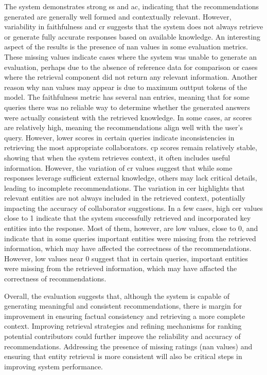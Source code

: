 The system demonstrates strong \gls{ss} and \gls{ac}, indicating that the recommendations generated are generally well formed and contextually relevant.
However, variability in faithfulness and \gls{cr} suggests that the system does not always retrieve or generate fully accurate responses based on available knowledge.
An interesting aspect of the results is the presence of \gls{nan} values in some evaluation metrics.
These missing values indicate cases where the system was unable to generate an evaluation, perhaps due to the absence of reference data for comparison or cases where the retrieval component did not return any relevant information.
Another reason why \gls{nan} values may appear is due to maximum outtput tokens of the model.
The faithfulness metric has several \gls{nan} entries, meaning that for some queries there was no reliable way to determine whether the generated answers were actually consistent with the retrieved knowledge.
In some cases, \gls{ar} scores are relatively high, meaning the recommendations align well with the user's query.
However, lower scores in certain queries indicate inconsistencies in retrieving the most appropriate collaborators.
\gls{cp} scores remain relatively stable, showing that when the system retrieves context, it often includes useful information.
However, the variation of \gls{cr} values suggest that while some responses leverage sufficient external knowledge, others may lack critical details, leading to incomplete recommendations.
The variation in \gls{cer} highlights that relevant entities are not always included in the retrieved context, potentially impacting the accuracy of collaborator suggestions.
In a few cases, high \gls{cer} values close to 1 indicate that the system successfully retrieved and incorporated key entities into the response.
Most of them, however, are low values, close to 0, and indicate that in some queries important entities were missing from the retrieved information, which may have affected the correctness of the recommendations.
However, low values near 0 suggest that in certain queries, important entities were missing from the retrieved information, which may have affacted the correctness of recommendations.

Overall, the evaluation suggests that, although the system is capable of generating meaningful and consistent recommendations, there is margin for improvement in ensuring factual consistency and retrieving a more complete context.
Improving retrieval strategies and refining mechanisms for ranking potential contributors could further improve the reliability and accuracy of recommendations.
Addressing the presence of missing ratings (\gls{nan} values) and ensuring that entity retrieval is more consistent will also be critical steps in improving system performance.

